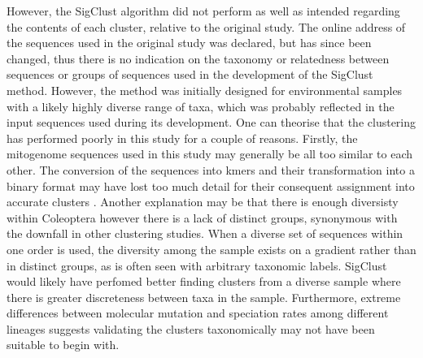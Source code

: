 \documentclass[12pt]{article}
\begin{document}
  However, the SigClust algorithm did not perform as well as intended regarding the contents of each cluster, relative to the original study. The online address of the sequences used in the original study was declared, but has since been changed, thus there is no indication on the taxonomy or relatedness between sequences or groups of sequences used in the development of the SigClust method. However, the method was initially designed for environmental samples with a likely highly diverse range of taxa, which was probably reflected in the input sequences used during its development. One can theorise that the clustering has performed poorly in this study for a couple of reasons. Firstly, the mitogenome sequences used in this study may generally be all too similar to each other. The conversion of the sequences into kmers and their transformation into a binary format may have lost too much detail for their consequent assignment into accurate clusters \cite{Chappell2017}. Another explanation may be that there is enough diversisty within Coleoptera however there is a lack of distinct groups, synonymous with the downfall in other clustering studies. When a diverse set of sequences within one order is used, the diversity among the sample exists on a gradient rather than in distinct groups, as is often seen with arbitrary taxonomic labels. SigClust would likely have perfomed better finding clusters from a diverse sample where there is greater discreteness between taxa in the sample. Furthermore, extreme differences between molecular mutation and speciation rates among different lineages suggests validating the clusters taxonomically may not have been suitable to begin with.
\end{document}
